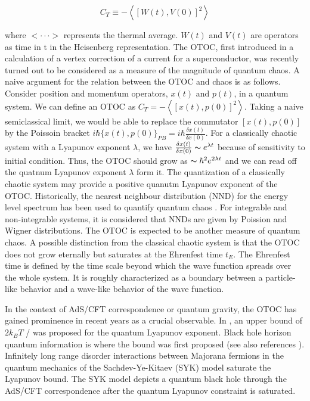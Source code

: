 \documentclass[12pt]{report}
\newcommand*{\1}{\hspace{1pt}}
\begin{document}
    \begin{equation}
        C_{T} \equiv  - \left\langle\left[W(t),V(0)\right]^{2}\right\rangle
    \end{equation}

    where $<\cdot \cdot \cdot >$ represents the thermal average. $W(t)$ and $V(t)$ are operators as time in t in the Heisenberg representation. The OTOC, first introduced
    in a calculation of a vertex correction of a current for a superconductor\cite{s12}, was recently turned out to be considered as a measure of the magnitude of 
    quantum chaos. A naive argument for the relation between the OTOC and chaos is as follows\cite{s13}. Consider position and momentum operators, $x(t)$ and $p(t)$, in a
    quantum system. We can define an OTOC as $C_{T} = - \left\langle\left[x(t),p(0)\right]^{2}\right\rangle$. Taking a naive semiclassical limit, we would be able to 
    replace the commutator $\left[x(t),p(0)\right]$ by the Poissoin bracket $i\hbar\{x(t),p(0)\}_{PB} = i\hbar\frac{\delta x(t)}{\delta x(0)}$. For a classically 
    chaotic system with a Lyapunov exponent $\lambda$, we have $\frac{\delta x(t)}{\delta x(0)}\thicksim  e^{\lambda t}$ because of sensitivity to initial condition.
    Thus, the OTOC should grow as $\thicksim \hbar^{2}e^{2\lambda t}$ and we can read off the quatnum Lyapunov exponent $\lambda$ form it. The quantization of a 
    classically chaotic system may provide a positive quanutm Lyapunov exponent of the OTOC. Historically, the nearest neighbour distribution (NND) for the energy
    level spectrum has been used to quantify quantum chaos \cite{s14}. For integrable and non-integrable systems, it is considered that NNDs are given by Poission
    and Wigner distributions. The OTOC is expected to be another measure of quantum chaos. A possible distinction from the classical chaotic system is that the 
    OTOC does not grow eternally but saturates at the Ehrenfest time $t_{E}$. The Ehrenfest time is defined by the time scale beyond which the wave function spreads
    over the whole system. It is roughly characterized as a boundary between a particle-like behavior and a wave-like behavior of the wave function.

    In the context of AdS/CFT correspondence \cite{s16} or quantum gravity, the OTOC has gained prominence in recent years as a crucial observable. In \cite{s17}, 
    an upper bound of $2k_{B}T$ / was proposed for the quantum Lyapunov exponent. Black hole horizon quantum information is where the bound was first proposed \cite{s18,s19} (see
    also references \cite{s20,s21,s22,s23,s24}). Infinitely long range disorder interactions between Majorana fermions in the quantum mechanics of the Sachdev-Ye-Kitaev (SYK) model 
    \cite{s25,s26} saturate the Lyapunov bound. The SYK model depicts a quantum black hole through the AdS/CFT correspondence after the quantum Lyapunov constraint is saturated.
\end{document}
